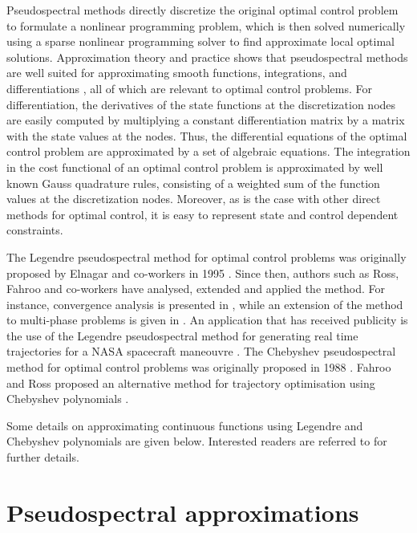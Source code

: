 \documentclass[a4paper,11pt]{report}    %
\begin{document}
Pseudospectral methods directly discretize the original optimal control problem to formulate a nonlinear programming problem, 
which is then solved numerically using a sparse nonlinear programming solver to find approximate local optimal solutions.
Approximation theory and practice shows that pseudospectral methods are well suited for approximating smooth functions, integrations, 
and differentiations \cite{Canuto:06, Trefethen:00}, all of which are relevant to optimal control problems. For differentiation, the derivatives of 
the state functions at the discretization nodes are easily computed by multiplying a constant differentiation matrix by 
a matrix with the state values at the nodes. Thus, the differential equations of the optimal control problem are approximated
by a set of algebraic equations. The integration in the cost functional of an optimal control problem is approximated by
well known Gauss quadrature rules, consisting of a weighted sum of the function values at the discretization nodes. 
Moreover, as is the case with other direct methods for optimal control, it is easy to represent state and control dependent constraints.

The Legendre pseudospectral method for optimal control problems was originally proposed by Elnagar and co-workers in 1995 \cite{Elnagar:95}. 
Since then, authors such as Ross, Fahroo and co-workers have analysed, extended and applied the method. For instance, convergence analysis
is presented in \cite{Kang:07b}, while an extension of the method to multi-phase problems is given in \cite{Ross:04}. 
An application that has received publicity is the use of the Legendre pseudospectral method for generating real time trajectories 
for a NASA spacecraft maneouvre \cite{Kang:07}.  The Chebyshev pseudospectral method for optimal control problems was originally proposed  
in 1988 \cite{Vlassenbroeck:88}. Fahroo and Ross proposed an alternative method for trajectory optimisation 
using Chebyshev polynomials \cite{Fahroo:02b}. 



Some details on approximating continuous functions using Legendre and Chebyshev polynomials are given below. Interested
readers are referred to \cite{Canuto:06} for further details.


\section{Pseudospectral approximations}
\end{document}
